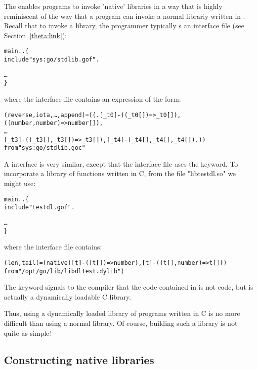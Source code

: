 The \goir enables \go programs to invoke 'native' libraries in a way that is highly reminiscent of the way that a \go program can invoke a normal librariy written in \go. Recall that to invoke a \go library, the programmer typically s an interface file (see Section~\vref{theta:link}):
\begin{alltt}
main .. \{
  include "sys:go/stdlib.gof".

  \ldots
\}
\end{alltt}
where the interface file contains an expression of the form:
\begin{alltt}
(reverse,iota,\ldots,append) = ((.[\_t0]-((\_t0[]) => \_t0[]),
  ((number,number) => number[]),
  \ldots
  [\_t3]-((\_t3[],\_t3[]) => \_t3[]),[\_t4]-(\_t4[],\_t4[],\_t4[]){}.))
 from "sys:go/stdlib.goc"
\end{alltt}
A  interface is very similar, except that the interface file uses the  keyword. To incorporate a library of functions written in C, from the file "libtestdl.so" we might use:
\begin{alltt}
main .. \{
  include "testdl.gof".

  \ldots
\}
\end{alltt}
where the  interface file contains:
\begin{alltt}
(len, tail) = (native ([t]-((t[])=>number), [t]-((t[],number)=>t[]))
               from "/opt/go/lib/libdltest.dylib")
\end{alltt}
The  keyword signals to the \go compiler that the code contained in  is not \go code, but is actually a dynamically loadable C library.

Thus, using a dynamically loaded library of programs written in C is no more difficult than using a normal library. Of course, building such a library is not quite as simple!

\subsection{Constructing native libraries}
\label{howitworks:construct}


